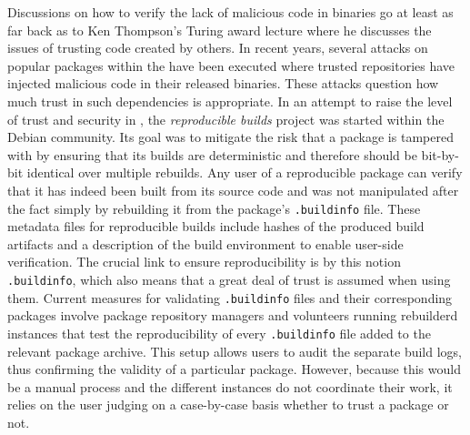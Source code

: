 \documentclass[english, biblatex, digitaloutput]{kththesis}
\begin{document}

Discussions on how to verify the lack of malicious code in binaries go at least as far back as to Ken Thompson's Turing award lecture \cite{thompson_reflections_1984} where he discusses the issues of trusting code created by others. In recent years, several attacks on popular packages within the  have been executed \cite{lamb_reproducible_2021} where trusted repositories have injected malicious code in their released binaries. These attacks question how much trust in such dependencies is appropriate. In an attempt to raise the level of trust and security in , the \textit{reproducible builds} project \cite{reproducible_builds_project} was started within the Debian community. Its goal was to mitigate the risk that a package is tampered with by ensuring that its builds are deterministic and therefore should be bit-by-bit identical over multiple rebuilds. Any user of a reproducible package can verify that it has indeed been built from its source code and was not manipulated after the fact simply by rebuilding it from the package's \texttt{.buildinfo} file. These metadata files for reproducible builds include hashes of the produced build artifacts and a description of the build environment to enable user-side verification. The crucial link to ensure reproducibility is by this notion \texttt{.buildinfo}, which also means that a great deal of trust is assumed when using them. Current measures for validating \texttt{.buildinfo} files and their corresponding packages involve package repository managers and volunteers running rebuilderd \cite{rebuilderd_public_nodate} instances that test the reproducibility of every \texttt{.buildinfo} file added to the relevant package archive. This setup allows users to audit the separate build logs, thus confirming the validity of a particular package. However, because this would be a manual process and the different instances do not coordinate their work, it relies on the user judging on a case-by-case basis whether to trust a package or not.
\end{document}
